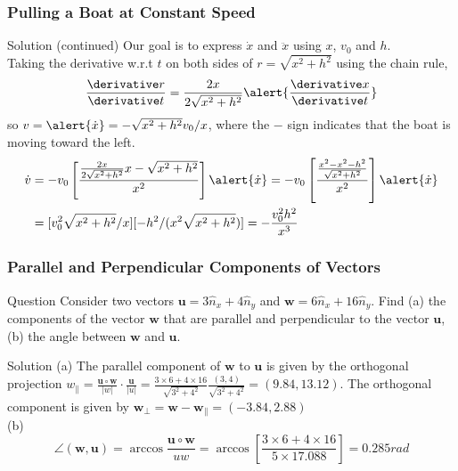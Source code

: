 \begin{frame}
\frametitle{Pulling a Boat at Constant Speed}
\begin{block}{Solution (continued)}
Our goal is to express $\dot{x}$ and $\ddot{x}$ using $x$, $v_0$ and $h$.\\
Taking the derivative w.r.t \alert{$t$} on both sides of $r=\sqrt{x^2+h^2}$ using \alert{the chain rule},
\[
\frac{\derivative r}{\derivative t}=\frac{2x}{2\sqrt{x^{2}+h^{2}}}\alert{\frac{\derivative x}{\derivative t}}
\]
so $v=\alert{\dot{x}}=-\sqrt{x^{2}+h^{2}}v_{0}/x$, where the $-$ sign indicates that the boat is moving toward the left.
\begin{align*}
\dot{v}&=-v_{0}\left[\frac{\frac{2x}{2\sqrt{x^{2}+h^{2}}}x-\sqrt{x^{2}+h^{2}}}{x^{2}}\right]\alert{\dot{x}}=-v_{0}\left[\frac{\frac{x^{2}-x^2-h^2}{\sqrt{x^{2}+h^{2}}}}{x^{2}}\right]\alert{\dot{x}}\\
&=[v_{0}^{2}\sqrt{x^{2}+h^{2}}/x][-h^{2}/(x^{2}\sqrt{x^{2}+h^{2}})]=-\frac{v_{0}^{2}h^{2}}{x^{3}}
\end{align*}
\end{block}
\end{frame}
\begin{frame}
\frametitle{Parallel and Perpendicular Components of Vectors}
\begin{block}{Question}
Consider two vectors $\mathbf{u}=3\hat{n}_x+4\hat{n}_y$ and $\mathbf{w}=6\hat{n}_x+16\hat{n}_y$. Find (a) the components of the vector $\mathbf{w}$ that are \alert{parallel} and \alert{perpendicular} to the vector $\mathbf{u}$, (b) the \alert{angle} between $\mathbf{w}$ and $\mathbf{u}$.
\end{block}
\begin{block}{Solution}
(a) The parallel component of $\mathbf{w}$ to $\mathbf{u}$ is given by the \alert{orthogonal projection} $w_{\parallel}=\frac{\mathbf{u}\circ\mathbf{w}}{|w|}\cdot \frac{\mathbf{u}}{|u|}=\frac{3\times 6+4\times 16}{\sqrt{3^{2}+4^{2}}}\frac{(3,4)}{\sqrt{3^{2}+4^{2}}}=(9.84,13.12)$.
The orthogonal component is given by $\mathbf{w}_{\perp}=\mathbf{w}-\mathbf{w}_{\parallel}=(-3.84,2.88)$\\
(b)\[\angle(\mathbf{w},\mathbf{u})=\arccos\frac{\mathbf{u}\circ\mathbf{w}}{uw}=\arccos[\frac{3\times 6+4\times 16}{5\times 17.088}]=0.285\unit{rad}\]
\end{block}
\end{frame}
